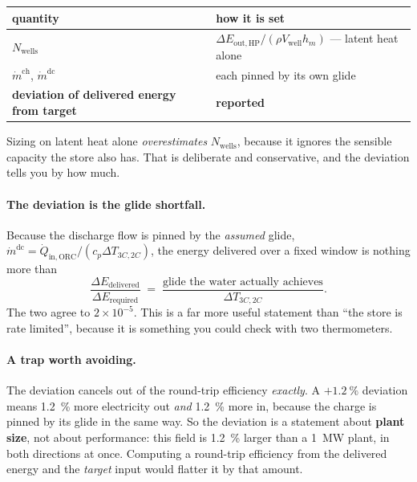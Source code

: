 \documentclass[11pt,a4paper]{article}
\newcommand{\md}{\ensuremath{\dot m}}
\newcommand{\hm}{\ensuremath{h_{m}}}
\newcommand{\Nwells}{\ensuremath{N_{\mathrm{wells}}}}
\begin{document}
\begin{center}
\begin{tabular}{@{}l l@{}}
\toprule
quantity & how it is set \\
\midrule
$\Nwells$ & $\Delta E_{\mathrm{out,HP}}/(\rho V_{\mathrm{well}}\hm)$ --- latent
  heat alone \\
$\md^{\mathrm{ch}}$, $\md^{\mathrm{dc}}$ & each pinned by its own glide \\
\midrule
\textbf{deviation of delivered energy from target} & \textbf{reported} \\
\bottomrule
\end{tabular}
\end{center}

Sizing on latent heat alone \emph{overestimates} $\Nwells$, because it ignores
the sensible capacity the store also has. That is deliberate and conservative,
and the deviation tells you by how much.

\paragraph{The deviation is the glide shortfall.}
Because the discharge flow is pinned by the \emph{assumed} glide,
$\md^{\mathrm{dc}} = \dot Q_{\mathrm{in,ORC}}/(c_p\Delta T_{3C,2C})$, the energy
delivered over a fixed window is nothing more than
\begin{equation}
  \frac{\Delta E_{\mathrm{delivered}}}{\Delta E_{\mathrm{required}}}
  \;=\;
  \frac{\text{glide the water actually achieves}}{\Delta T_{3C,2C}} .
  \label{eq:glide}
\end{equation}
The two agree to $2\times10^{-5}$. This is a far more useful statement than
``the store is rate limited'', because it is something you could check with two
thermometers.

\paragraph{A trap worth avoiding.}
The deviation cancels out of the round-trip efficiency \emph{exactly}. A
$+\SI{1.2}{\percent}$ deviation means \SI{1.2}{\percent} more electricity out
\emph{and} \SI{1.2}{\percent} more in, because the charge is pinned by its glide
in the same way. So the deviation is a statement about \textbf{plant size}, not
about performance: this field is \SI{1.2}{\percent} larger than a
\SI{1}{\mega\watt} plant, in both directions at once. Computing a round-trip
efficiency from the delivered energy and the \emph{target} input would flatter
it by that amount.
\end{document}
